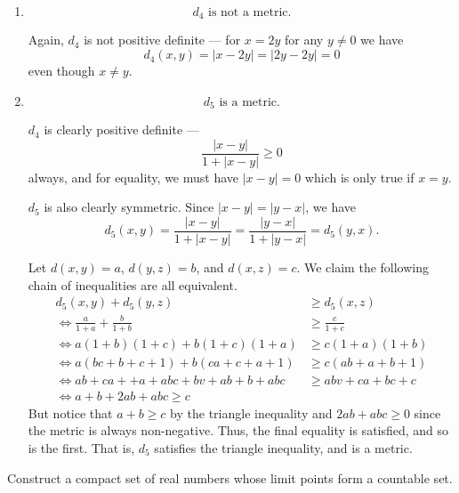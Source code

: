 \documentclass[12 pt, letterpaper]{hmcpset}
\begin{document}
\begin{solution}
\begin{enumerate}[label = (\arabic*)]
			Note that $d_{3}$ is not positive definite --- for $x = - y$ and $x \neq 0$, we have \[
				d_{3}(x, y) = \lvert x^{2} - y^{2} \rvert = \lvert x^{2} - (-x)^{2} \rvert = 0
			\]
			even though $x \neq y$.
		\item
			\[
				\boxed{
					d_{4} \text{ is not a metric}.
				}
			\]

			Again,  $d_{4}$ is not positive definite --- for $x = 2y$ for any $y \neq 0$ we have
			\[
				d_{4}(x, y) = \lvert x - 2y \rvert = \lvert 2y - 2y \rvert = 0
			\]
			even though $x \neq y$.
		\item
			\[
				\boxed{
					d_{5} \text{ is a metric}.
				}
			\]

			$d_{4}$ is clearly positive definite ---
			\[
				\frac{\lvert x - y \rvert}{1 + \lvert x - y \rvert} \ge 0
			\]
			always, and for equality, we must have $\lvert x - y \rvert = 0$ which is only true if $x = y$.

			$d_{5}$ is also clearly symmetric. Since $\lvert x - y \rvert = \lvert y - x \rvert$, we have 
			\[
				d_{5}(x, y) = \frac{\lvert x - y \rvert}{1 + \lvert x - y \rvert} = \frac{\lvert y - x \rvert}{1 + \lvert y - x \rvert} = d_{5}(y, x).
			\]

			Let $d(x, y) = a$, $d(y, z) = b$, and $d(x, z) = c$. We claim the following chain of inequalities are all equivalent.
			\[
				\begin{split}
					d_{5}(x, y) + d_{5}(y, z) & \ge d_{5}(x, z) \\
					\iff \frac{a}{1 + a} + \frac{b}{1 + b} & \ge \frac{c}{1 + c} \\
					\iff a(1 + b)(1 + c) + b(1 + c)(1 + a) & \ge c(1 + a)(1 + b) \\
					\iff a(bc + b + c + 1) + b(ca + c + a + 1) & \ge c(ab + a + b + 1) \\
					\iff ab + ca + + a + abc + bv + ab + b + abc & \ge abv + ca + bc + c \\
					\iff a + b + 2ab + abc \ge c
				\end{split}
			\]
			But notice that $a + b \ge c$ by the triangle inequality and $2ab + abc \ge 0$ since the metric is always non-negative. Thus, the final equality is satisfied, and so is the first. That is, $d_{5}$ satisfies the triangle inequality, and is a metric.
	\end{enumerate}
\end{solution}

\pagebreak

\begin{problem}
	Construct a compact set of real numbers whose limit points form a countable set.
\end{problem}
\end{document}
